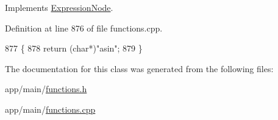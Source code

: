 Implements \hyperlink{classExpressionNode_a42a5e9562b0f645a19dcc83f698069b5}{Expression\+Node}.



Definition at line 876 of file functions.\+cpp.


\begin{DoxyCode}
877 \{
878     \textcolor{keywordflow}{return} (\textcolor{keywordtype}{char}*)\textcolor{stringliteral}{"asin"};
879 \}
\end{DoxyCode}


The documentation for this class was generated from the following files\+:\begin{DoxyCompactItemize}
\item 
app/main/\hyperlink{functions_8h}{functions.\+h}\item 
app/main/\hyperlink{functions_8cpp}{functions.\+cpp}\end{DoxyCompactItemize}
